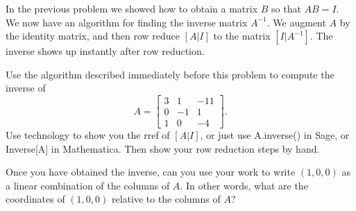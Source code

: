 In the previous problem we showed how to obtain a matrix $B$ so that $AB=I$. We now have an algorithm for finding the inverse matrix $A^{-1}$. We augment $A$ by the identity matrix, and then row reduce $[A|I]$ to the matrix $[I|A^{-1}]$.  The inverse shows up instantly after row reduction.


\begin{problem}
 Use the algorithm described immediately before this problem to compute the inverse of 
$$A=\begin{bmatrix}
 3 & 1 & -11 \\
 0 & -1 & 1 \\
 1 & 0 & -4
\end{bmatrix}.$$
Use technology to show you the rref of $[A|I]$, or just use A.inverse() in Sage, or Inverse[A] in Mathematica.  
Then show your row reduction steps by hand.

Once you have obtained the inverse, can you use your work to write $(1,0,0)$ as a linear combination of the columns of $A$. In other words, what are the coordinates of  $(1,0,0)$ relative to the columns of $A$?
\end{problem}


\mysubsection{\ideaind}


